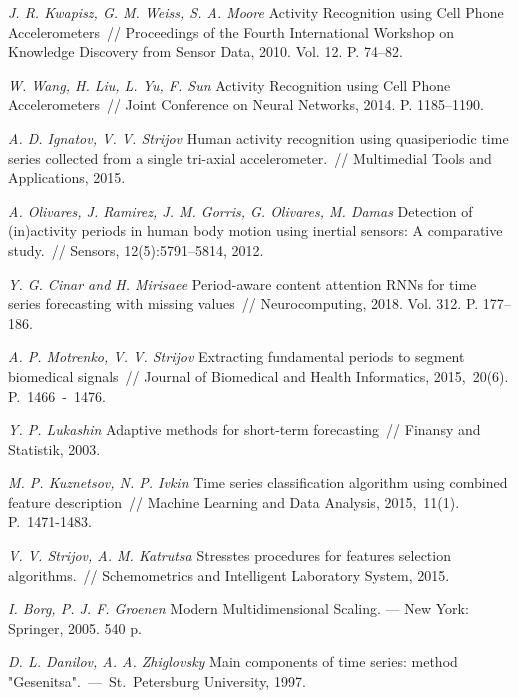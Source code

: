 \documentclass[12pt, twoside]{article}
\numberwithin{equation}{section}
\begin{document}
\begin{thebibliography}{99}
	\textit{J. R. Kwapisz, G. M. Weiss, S. A. Moore} Activity Recognition using Cell Phone Accelerometers~// Proceedings of the Fourth International Workshop on Knowledge Discovery from Sensor Data, 2010. Vol. 12. P. 74--82.
	
	\textit{W. Wang, H. Liu, L. Yu, F. Sun} Activity Recognition using Cell Phone Accelerometers~// Joint Conference on Neural Networks, 2014. P. 1185--1190.
	
	\textit{A. D. Ignatov, V. V. Strijov} Human activity recognition using quasiperiodic time series collected from a single tri-axial accelerometer.~// Multimedial Tools and Applications, 2015.
	
	\textit{A. Olivares, J. Ramirez, J. M. Gorris, G. Olivares, M. Damas} Detection of (in)activity periods in human body motion using inertial sensors: A comparative study.~// Sensors, 12(5):5791–5814, 2012.
	
	\textit{Y. G. Cinar and H. Mirisaee} Period-aware content attention RNNs for time series forecasting with missing values~// Neurocomputing, 2018. Vol. 312. P. 177--186.
	
	\textit{A. P. Motrenko, V. V. Strijov} Extracting fundamental periods to segment biomedical signals~// Journal of Biomedical and Health Informatics, 2015,~20(6). P.~1466~-~1476.
	
	\textit{Y. P. Lukashin} Adaptive methods for short-term forecasting~// Finansy and Statistik, 2003.
	
	\textit{M. P. Kuznetsov,  N. P. Ivkin} Time series classification algorithm using combined feature description~// Machine Learning and Data Analysis, 2015,~11(1). P.~1471-1483.
	
	\textit{V. V. Strijov, A. M. Katrutsa} Stresstes procedures for features selection algorithms.~// Schemometrics and Intelligent Laboratory System, 2015.
	
	\textit{I. Borg, P. J. F. Groenen} Modern Multidimensional Scaling. --- New York: Springer, 2005. 540 p.
	
	\textit{D. L. Danilov, A. A. Zhiglovsky} Main components of time series: method "Gesenitsa".~---~St.~Petersburg University, 1997.
	

	
\end{thebibliography}
\end{document}
